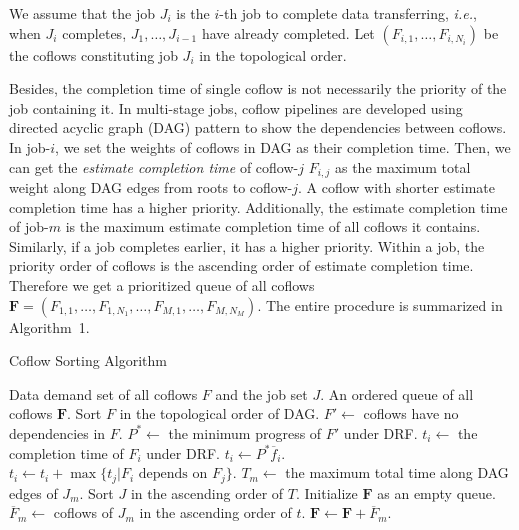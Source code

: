 \documentclass[10pt, conference, letterpaper]{IEEEtran}
\begin{document}
We assume that the job $J_i$ is the $i$-th job to complete data transferring, \emph{i.e.}, when $J_i$ completes, $J_1,\dots,J_{i-1}$ have already completed. Let $(F_{i,1},\dots,F_{i,N_i})$ be the coflows constituting job $J_i$ in the topological order.

Besides, the completion time of single coflow is not necessarily the priority of the job containing it. In multi-stage jobs, coflow pipelines are developed using directed acyclic graph (DAG) pattern to show the dependencies between coflows. In job-$i$, we set the weights of coflows in DAG as their completion time. Then, we can get the \emph{estimate completion time} of coflow-$j$ $F_{i,j}$ as the maximum total weight along DAG edges from roots to coflow-$j$. A coflow with shorter estimate completion time has a higher priority. Additionally, the estimate completion time of job-$m$ is the maximum estimate completion time of all coflows it contains. Similarly, if a job completes earlier, it has a higher priority. Within a job, the priority order of coflows is the ascending order of estimate completion time. Therefore we get a prioritized queue of all coflows $\mathbf{F} = (F_{1,1},\dots,F_{1,N_1},\dots,F_{M,1},\dots,F_{M,N_M})$. The entire procedure is summarized in Algorithm~1.

\begin{algorithm}
	\caption{Coflow Sorting Algorithm}
	\begin{algorithmic}[1]
		\Require Data demand set of all coflows $F$ and the job set $J$.
		\Ensure An ordered queue of all coflows $\mathbf{F}$.
		\State Sort $F$ in the topological order of DAG.
		\State $F' \gets $ coflows have no dependencies in $F$.
		\State $P^* \gets$ the minimum progress of $F'$ under DRF.
				\State $t_i \gets$ the completion time of $F_i$ under DRF.
			\Else
				\State $t_i \gets P^*\overline{f}_i$.
			\EndIf
				\State $t_i \gets t_i + \max{\{t_j|F_i \text{ depends on } F_j\}}$.
			\EndIf
		\EndFor
		\State $T_m \gets$ the maximum total time along DAG edges of $J_m$.
		\State Sort $J$ in the ascending order of $T$.
		\State Initialize $\mathbf{F}$ as an empty queue.
			\State $\overline{F}_m \gets$ coflows of $J_m$ in the ascending order of $t$.
			\State $\mathbf{F} \gets \mathbf{F} + \overline{F}_m$.
		\EndFor
	\end{algorithmic}
\end{algorithm}
\end{document}
